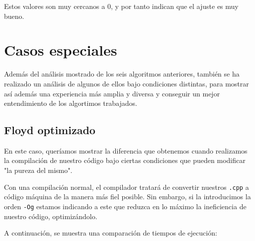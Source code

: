 \documentclass[10pt,a4paper]{article}
\begin{document}
Estos valores son muy cercanos a 0, y por tanto indican que el ajuste es muy bueno.

\section{Casos especiales}

Además del análisis mostrado de los seis algoritmos anteriores, también se ha realizado un análisis de algunos de ellos bajo condiciones distintas, para mostrar así además una experiencia más amplia y diversa y conseguir un mejor entendimiento de los algortimos trabajados.

\subsection{Floyd optimizado}

En este caso, queríamos mostrar la diferencia que obtenemos cuando realizamos la compilación de nuestro código bajo ciertas condiciones que pueden modificar "la pureza del mismo". 

Con una compilación normal, el compilador tratará de convertir nuestros \texttt{.cpp} a código máquina de la manera más fiel posible. Sin embargo, si la introducimos la orden \texttt{-Og} estamos indicando a este que reduzca en lo máximo la ineficiencia de nuestro código, optimizándolo.

A continuación, se muestra una comparación de tiempos de ejecución:
\end{document}
